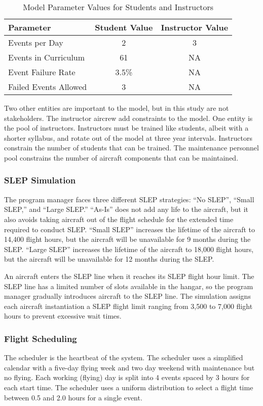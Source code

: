 \begin{table}[h]
  \centering
  \begin{tabular}{l c c}
    \hline
    \hline
    \textbf{Parameter} & \textbf{Student Value} & \textbf{Instructor Value} \\
    \hline
    Events per Day & 2 & 3 \\
    Events in Curriculum & 61 & NA \\
    Event Failure Rate & 3.5\% & NA \\
    Failed Events Allowed & 3 & NA \\
    \hline
  \end{tabular}
  \caption{Model Parameter Values for Students and Instructors}
  \label{t:aircrewParams}
\end{table}

Two other entities are important to the model, but in this study are
not stakeholders. The instructor aircrew  add
constraints to the model. One entity is the pool of
instructors. Instructors must be trained like students, albeit with a
shorter syllabus, and rotate out of the model at three year
intervals. Instructors constrain the number of students that can be
trained. The maintenance personnel pool constrains the number of
aircraft components that can be maintained.

\subsubsection{SLEP Simulation}

The program manager faces three different SLEP strategies: ``No
SLEP'', ``Small SLEP,'' and ``Large SLEP.'' ``As-Is'' does not add any
life to the aircraft, but it also avoids 
taking aircraft out of the flight schedule for the extended time
required to conduct SLEP. ``Small SLEP'' increases the 
lifetime of the aircraft to 14,400 flight hours, 
but the aircraft will be unavailable for 9 months during the
SLEP. ``Large SLEP'' increases the lifetime of the
aircraft to 18,000 flight hours, but the aircraft will be unavailable for
12 months during the SLEP.

An aircraft enters the SLEP line when it reaches its SLEP flight hour
limit. The SLEP line has a limited number of slots available in the
hangar, so the program manager gradually introduces aircraft to the
SLEP line. The simulation assigns each aircraft instantiation a SLEP
flight limit ranging from 3,500  to 7,000 flight hours to prevent
excessive wait times.  

\subsubsection{Flight Scheduling}
The scheduler is the heartbeat of the system. The scheduler uses a
simplified calendar with a five-day flying week and two day weekend
with maintenance but no flying. Each working (flying) day is split into 4
events spaced by 3 hours for each start time. The scheduler uses a
uniform distribution to select a flight time between 0.5 and 2.0 hours
for a single event.

